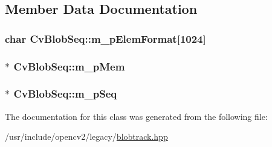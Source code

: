 \subsection{Member Data Documentation}
\hypertarget{classCvBlobSeq_adfa39b702e62903d78e814ef41e148df}{
\subsubsection[{m\-\_\-p\-Elem\-Format}]{\setlength{\rightskip}{0pt plus 5cm}char Cv\-Blob\-Seq\-::m\-\_\-p\-Elem\-Format\mbox{[}1024\mbox{]}\hspace{0.3cm}{\ttfamily [protected]}}}\label{classCvBlobSeq_adfa39b702e62903d78e814ef41e148df}
\hypertarget{classCvBlobSeq_a746f0a9025b3cea1ba6dfa7008b5c50e}{
\subsubsection[{m\-\_\-p\-Mem}]{$\ast$ Cv\-Blob\-Seq\-::m\-\_\-p\-Mem\hspace{0.3cm}{\ttfamily [protected]}}}\label{classCvBlobSeq_a746f0a9025b3cea1ba6dfa7008b5c50e}
\hypertarget{classCvBlobSeq_a1c04c046c60c59bba9e21820b68e6b8e}{
\subsubsection[{m\-\_\-p\-Seq}]{$\ast$ Cv\-Blob\-Seq\-::m\-\_\-p\-Seq\hspace{0.3cm}{\ttfamily [protected]}}}\label{classCvBlobSeq_a1c04c046c60c59bba9e21820b68e6b8e}


The documentation for this class was generated from the following file\-:\begin{DoxyCompactItemize}
\item 
/usr/include/opencv2/legacy/\hyperlink{blobtrack_8hpp}{blobtrack.\-hpp}\end{DoxyCompactItemize}
